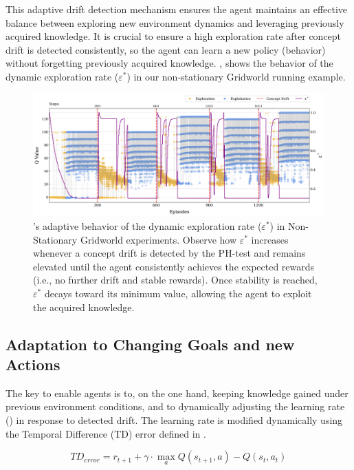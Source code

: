 This adaptive drift detection mechanism ensures the agent maintains an effective balance between 
exploring new environment dynamics and leveraging previously acquired knowledge. It is crucial to 
ensure a high exploration rate after concept drift is detected consistently, so the agent can learn a 
new policy (\ie behavior) without forgetting previously acquired knowledge. , 
shows the behavior of the dynamic exploration rate ($\varepsilon^*$) in our non-stationary Gridworld 
running example.

\begin{figure}[hptb]
    \centering
    \includegraphics[width=\textwidth]{figures/eps}
    \caption{\adaptiverl's adaptive behavior of the dynamic exploration rate ($\varepsilon^*$) in Non-Stationary Gridworld experiments. Observe how $\varepsilon^*$ increases whenever a concept drift is detected by the PH-test and remains elevated until the agent consistently achieves the expected rewards (i.e., no further drift and stable rewards). Once stability is reached, $\varepsilon^*$ decays toward its minimum value, allowing the agent to exploit the acquired knowledge.}
    \label{fig:dynamic-eps}
\end{figure}

\subsection{Adaptation to Changing Goals and new Actions}
\label{sec:morphin-adaptation}

The key to enable agents is to, on the one hand, keeping knowledge gained under previous 
environment conditions, and to dynamically adjusting the learning rate (\lrate{\alpha}) in response 
to detected drift. The learning rate is modified dynamically using the Temporal Difference (TD) error 
defined in .

\begin{equation} \label{eq:td_error}
    TD_{error} = r_{t+1} + \gamma \cdot \underset{a}{\max} Q(s_{t+1}, a) - Q(s_t, a_t)
\end{equation}

